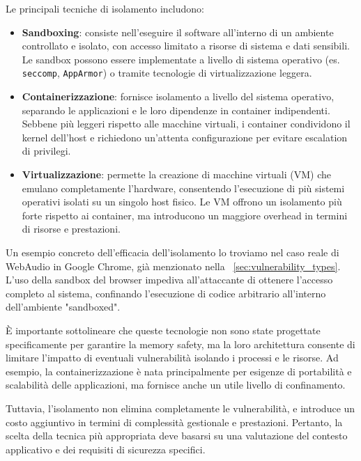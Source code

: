 Le principali tecniche di isolamento includono:
\begin{itemize}
  \item \textbf{Sandboxing}: consiste nell'eseguire il software all'interno di un
    ambiente controllato e isolato, con accesso limitato a risorse di sistema e
    dati sensibili. Le sandbox possono essere implementate a livello di sistema operativo
    (es. \texttt{seccomp}, \texttt{AppArmor}) o tramite tecnologie di virtualizzazione
    leggera.

  \item \textbf{Containerizzazione}: fornisce isolamento a livello del sistema operativo,
    separando le applicazioni e le loro dipendenze in container indipendenti. Sebbene
    più leggeri rispetto alle macchine virtuali, i container condividono il
    kernel dell'host e richiedono un'attenta configurazione per evitare
    escalation di privilegi.

  \item \textbf{Virtualizzazione}: permette la creazione di macchine virtuali (VM)
    che emulano completamente l'hardware, consentendo l'esecuzione di più
    sistemi operativi isolati su un singolo host fisico. Le VM offrono un isolamento
    più forte rispetto ai container, ma introducono un maggiore overhead in
    termini di risorse e prestazioni.
\end{itemize}

Un esempio concreto dell'efficacia dell'isolamento lo troviamo nel caso reale di
WebAudio in Google Chrome, già menzionato nella ~\autoref{sec:vulnerability_types}.
L'uso della sandbox del browser impediva all'attaccante di ottenere l'accesso
completo al sistema, confinando l'esecuzione di codice arbitrario all'interno dell'ambiente
"sandboxed".~\cite{webaudio_uaf}

È importante sottolineare che queste tecnologie non sono state progettate specificamente
per garantire la memory safety, ma la loro architettura consente di limitare l'impatto
di eventuali vulnerabilità isolando i processi e le risorse. Ad esempio, la
containerizzazione è nata principalmente per esigenze di portabilità e
scalabilità delle applicazioni, ma fornisce anche un utile livello di confinamento.

Tuttavia, l'isolamento non elimina completamente le vulnerabilità, e introduce un
costo aggiuntivo in termini di complessità gestionale e prestazioni. Pertanto, la
scelta della tecnica più appropriata deve basarsi su una valutazione del contesto
applicativo e dei requisiti di sicurezza specifici.